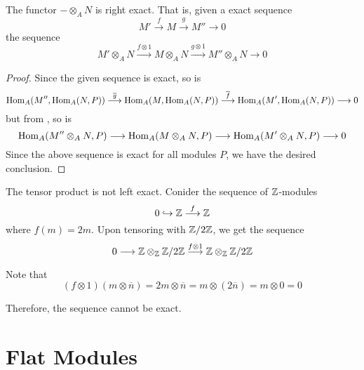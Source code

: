 \begin{theorem}
    The functor $-\otimes_A N$ is right exact. That is, given a exact sequence
    \begin{equation*}
        M'\stackrel{f}{\longrightarrow}M\stackrel{g}{\longrightarrow}M''\longrightarrow 0
    \end{equation*}
    the sequence 
    \begin{equation*}
        M'\otimes_A N\stackrel{f\otimes 1}{\longrightarrow}M\otimes_A N\stackrel{g\otimes 1}{\longrightarrow}M''\otimes_A N\longrightarrow 0
    \end{equation*}
\end{theorem}
\begin{proof}
    Since the given sequence is exact, so is 
    \begin{equation*}
        \operatorname{Hom}_A(M'',\operatorname{Hom}_A(N,P))\stackrel{\overline g}{\longrightarrow}\operatorname{Hom}_A(M,\operatorname{Hom}_A(N,P))\stackrel{\overline f}{\longrightarrow}\operatorname{Hom}_A(M',\operatorname{Hom}_A(N,P))\longrightarrow 0
    \end{equation*}
    but from , so is
    \begin{equation*}
        \operatorname{Hom}_A(M''\otimes_A N, P)\longrightarrow\operatorname{Hom}_A(M\otimes_A N, P)\longrightarrow\operatorname{Hom}_A(M'\otimes_A N, P)\longrightarrow 0
    \end{equation*}
    Since the above sequence is exact for all modules $P$, we have the desired conclusion.
\end{proof}

The tensor product is not left exact. Conider the sequence of $\mathbb{Z}$-modules
\begin{equation*}
    0\hookrightarrow\mathbb{Z}\stackrel{f}{\longrightarrow}\mathbb{Z}
\end{equation*}
where $f(m) = 2m$. Upon tensoring with $\mathbb{Z}/2\mathbb{Z}$, we get the sequence 
\begin{equation*}
    0\longrightarrow\mathbb{Z}\otimes_{\mathbb{Z}}\mathbb{Z}/2\mathbb{Z}\stackrel{f\otimes1}{\longrightarrow}\mathbb{Z}\otimes_{\mathbb{Z}}\mathbb{Z}/2\mathbb{Z}
\end{equation*}

Note that 
\begin{equation*}
    (f\otimes 1)(m\otimes\overline n) = 2m\otimes\overline{n} = m\otimes(2\overline n) = m\otimes 0 = 0
\end{equation*}

Therefore, the sequence cannot be exact.

\section{Flat Modules}

